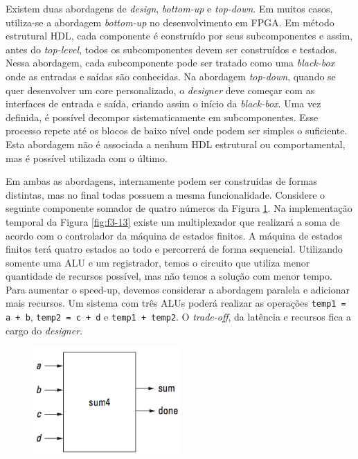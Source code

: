 Existem duas abordagens de \textit{design}, \textit{bottom-up} e \textit{top-down}. Em muitos casos, utiliza-se a abordagem \textit{bottom-up} no desenvolvimento em FPGA. Em método estrutural HDL, cada componente é construído por seus subcomponentes e assim, antes do \textit{top-level}, todos os subcomponentes devem ser construídos e testados. Nessa abordagem, cada subcomponente pode ser tratado como uma \textit{black-box} onde as entradas e saídas são conhecidas. Na abordagem \textit{top-down}, quando se quer desenvolver um core personalizado, o \textit{\textit{design}er} deve começar com as interfaces de entrada e saída, criando assim o início da \textit{black-box}. Uma vez definida, é possível decompor sistematicamente em subcomponentes. Esse processo repete até os blocos de baixo nível onde podem ser simples o suficiente. Esta abordagem não é associada a nenhum HDL estrutural ou comportamental, mas é possível utilizada com o último.

Em ambas as abordagens, internamente podem ser construídas de formas distintas, mas no final todas possuem a mesma funcionalidade. Considere o seguinte componente somador de quatro números da Figura \ref{fig:f3-12}. Na implementação temporal da Figura \ref{fig:f3-13} existe um multiplexador que realizará a soma de acordo com o controlador da máquina de estados finitos. A máquina de estados finitos terá quatro estados ao todo e percorrerá de forma sequencial. Utilizando somente uma ALU e um registrador, temos o circuito que utiliza menor quantidade de recursos possível, mas não temos a solução com menor tempo. Para aumentar o speed-up, devemos considerar a abordagem paralela e adicionar mais recursos. Um sistema com três ALUs poderá realizar as operações \texttt{temp1 = a + b}, \texttt{temp2 = c + d} e \texttt{temp1 + temp2}. O \textit{trade-off}, da latência e recursos fica a cargo do \textit{\textit{design}er}.



\begin{figure}[H] \centering

	\includegraphics[width=0.5\textwidth]{img/f3-12.png}

	\caption{}

	\label{fig:f3-12}

\end{figure}



